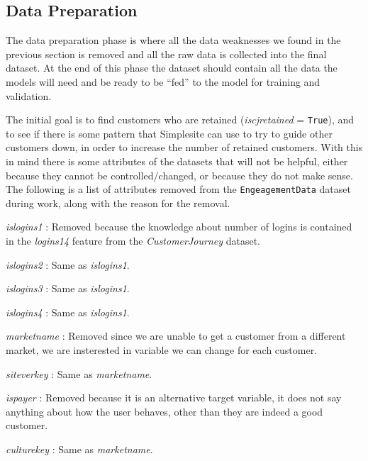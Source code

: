 \subsection{Data Preparation}
\label{sec:datasetpruning}

The data preparation phase is where all the data weaknesses we found in the
previous section is removed and all the raw data is collected into the final
dataset. At the end of this phase the dataset should contain all the data the
models will need and be ready to be ``fed'' to the model for training and
validation.

The initial goal is to find customers who are retained (\textit{iscjretained} =
\texttt{True}), and to see if there is some pattern that Simplesite can use to
try to guide other customers down, in order to increase the number of retained
customers. With this in mind there is some attributes of the datasets that will
not be helpful, either because they cannot be controlled/changed, or because
they do not make sense. The following is a list of attributes removed from the
\texttt{EngeagementData} dataset during work, along with the reason for the
removal.

\begin{itemize*}
    \item \textit{islogins1} : Removed because the knowledge about number of
          logins is contained in the \textit{logins14} feature from the
          \textit{CustomerJourney} dataset.

    \item \textit{islogins2} : Same as \textit{islogins1}.

    \item \textit{islogins3} : Same as \textit{islogins1}.

    \item \textit{islogins4} : Same as \textit{islogins1}.

    \item \textit{marketname} : Removed since we are unable to get a customer from
          a different market, we are insterested in variable we can change for
          each customer.

    \item \textit{siteverkey} : Same as \textit{marketname}.

    \item \textit{ispayer} : Removed because it is an alternative target variable,
          it does not say anything about how the user behaves, other than they are
          indeed a good customer.

    \item \textit{culturekey} : Same as \textit{marketname}.
\end{itemize*}

